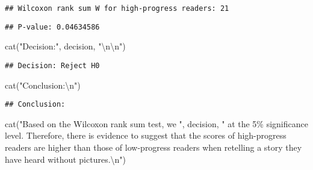 \documentclass[
]{article}
\newenvironment{Shaded}{\begin{snugshade}}{\end{snugshade}}
\newcommand{\FunctionTok}[1]{\textcolor[rgb]{0.00,0.00,0.00}{#1}}
\newcommand{\NormalTok}[1]{#1}
\newcommand{\SpecialCharTok}[1]{\textcolor[rgb]{0.00,0.00,0.00}{#1}}
\newcommand{\StringTok}[1]{\textcolor[rgb]{0.31,0.60,0.02}{#1}}
\begin{document}
\begin{verbatim}
## Wilcoxon rank sum W for high-progress readers: 21
\end{verbatim}

\begin{Shaded}
\end{Shaded}

\begin{verbatim}
## P-value: 0.04634586
\end{verbatim}

\begin{Shaded}
\begin{Highlighting}[]
\FunctionTok{cat}\NormalTok{(}\StringTok{"Decision:"}\NormalTok{, decision, }\StringTok{"}\SpecialCharTok{\textbackslash{}n\textbackslash{}n}\StringTok{"}\NormalTok{)}
\end{Highlighting}
\end{Shaded}

\begin{verbatim}
## Decision: Reject H0
\end{verbatim}

\begin{Shaded}
\begin{Highlighting}[]
\FunctionTok{cat}\NormalTok{(}\StringTok{"Conclusion:}\SpecialCharTok{\textbackslash{}n}\StringTok{"}\NormalTok{)}
\end{Highlighting}
\end{Shaded}

\begin{verbatim}
## Conclusion:
\end{verbatim}

\begin{Shaded}
\begin{Highlighting}[]
\FunctionTok{cat}\NormalTok{(}\StringTok{"Based on the Wilcoxon rank sum test, we "}\NormalTok{, decision, }\StringTok{" at the 5\% significance level. Therefore, there is evidence to suggest that the scores of high{-}progress readers are higher than those of low{-}progress readers when retelling a story they have heard without pictures.}\SpecialCharTok{\textbackslash{}n}\StringTok{"}\NormalTok{)}
\end{Highlighting}
\end{Shaded}
\end{document}
